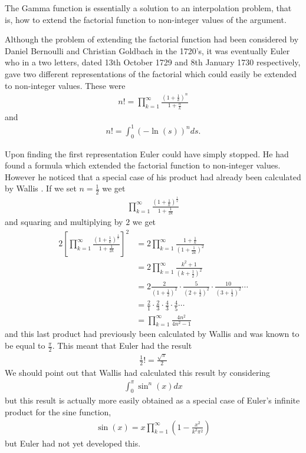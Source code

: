 The Gamma function is essentially a solution to an interpolation problem, that is, how to extend the factorial function to non-integer values of the argument. 



Although the problem of extending the factorial function had been considered by Daniel Bernoulli and Christian Goldbach in the 1720’s, it was eventually Euler who in a two letters, dated 13th October 1729 and 8th January 1730 respectively, gave two different representations of the factorial which could easily be extended to non-integer values. These were
\begin{align}
    \label{eq:euler_prod}
    n! = \prod_{k=1}^\infty \frac{\left(1+\frac{1}{k}\right)^n}{1 + \frac{n}{k}}
\end{align}
and
\begin{align}
    \label{eq:euler_log}
    n! = \int_0^1 (-\ln(s))^n ds.
\end{align}

Upon finding the first representation Euler could have simply stopped. He had found a formula which extended the factorial function to non-integer values. However he noticed that a special case of his product had already been calculated by Wallis \cite{Davis1959}. If we set $ n = \frac{1}{2} $ we get
\begin{align}
    \prod_{k=1}^\infty \frac{(1 + \frac{1}{k})^\frac{1}{2}}{1 + \frac{1}{2k}}
\end{align}
and squaring and multiplying by $ 2 $ we get
\begin{align*}
    2 \left[ \prod_{k=1}^\infty \frac{(1 + \frac{1}{k})^\frac{1}{2}}{1 + \frac{1}{2k}}\right]^2 &= 2\prod_{k=1}^\infty \frac{1+\frac{1}{k}}{(1+\frac{1}{2k})^2} \\
    &= 2 \prod^\infty_{k=1} \frac{k^2+1}{(k + \frac{1}{2})^2} \\
    &= 2 \frac{2}{(1+\frac{1}{2})^2} \cdot \frac{5}{(2 + \frac{1}{2})^2} \cdot \frac{10}{(3+\frac{1}{2})^2}\cdots \\
    &= \frac{2}{1}\cdot\frac{2}{3}\cdot\frac{4}{3}\cdot\frac{4}{5}\cdots \\
    &= \prod_{k=1}^{\infty} \frac{4n^2}{4n^2-1}
\end{align*}
and this last product had previously been calculated by Wallis and was known to be equal to $ \frac{\pi}{2} $. This meant that Euler had the result 
\begin{align*}
    \frac{1}{2} ! = \frac{\sqrt{\pi}}{2}
\end{align*}
We should point out that Wallis had calculated this result by considering 
\begin{align*}
    \int_0^\pi \sin^n(x) dx
\end{align*}
but this result is actually more easily obtained as a special case of Euler's infinite product for the sine function,
\begin{align*}
    \sin(x) = x\prod_{k=1}^\infty \left( 1 - \frac{x^2}{k^2\pi^2} \right)
\end{align*}
but Euler had not yet developed this.

